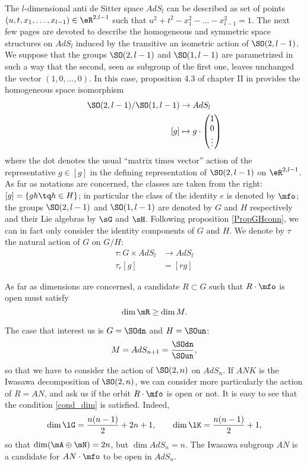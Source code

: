 The $l$-dimensional anti de Sitter space $AdS_l$ can be described as set of points $(u,t,x_1,\ldots,x_{l-1})\in \eR^{2,l-1}$  such that $u^2+t^2-x_1^2-\ldots-x_{l-1}^2=1$. The next few pages are devoted to describe the homogeneous and symmetric space structures on $AdS_l$ induced by the transitive an isometric action of $\SO(2,l-1)$. We suppose that the groups $\SO(2,l-1)$ and $\SO(1,l-1)$ are parametrized in such a way that the second, seen as subgroup of the first one, leaves unchanged the vector $(1,0,\ldots,0)$. In this case, proposition 4.3 of chapter II in \cite{Helgason} provides the homogeneous space isomorphism
\begin{equation}
\begin{aligned}
  \SO(2,l-1)/\SO(1,l-1)&\to AdS_l \\ 
[g]&\mapsto  
 g\cdot
\begin{pmatrix}
1\\0\\\vdots
\end{pmatrix}
\end{aligned}
\end{equation}
where the dot denotes the usual ``matrix times vector'' action of the representative $g\in [g]$ in the defining representation of $\SO(2,l-1)$ on $\eR^{2,l-1}$. As far as notations are concerned, the classes are taken from the right:  $[g]=\{gh\tq h\in H\}$; in particular the class of the identity $e$ is denoted by $\mfo$; the groups $\SO(2,l-1)$ and $\SO(1,l-1)$ are denoted by $G$ and $H$ respectively and their Lie algebras by $\sG$ and $\sH$. Following proposition \ref{PropGHconn}, we can in fact only consider the identity components of $G$ and $H$. We denote by $\tau$ the natural action of $G$ on $G/H$:
\begin{equation}
\begin{aligned}
 \tau\colon G\times AdS_l&\to AdS_l \\ 
   \tau_r[g]&= [rg] 
\end{aligned}
\end{equation}

As far as dimensions are concerned, a candidate $R\subset G$ such that $R\cdot\mfo$ is open must satisfy
\begin{equation}\label{cond_dim}
                  \dim\mR\geq\dim M.
\end{equation}

The case that interest us is $G=\SOdn$ and $H=\SOun$:
\[
M=AdS_{n+1}=\dfrac{\SOdn}{\SOun},
\]
 so that we have to consider the action of $\SO(2,n)$ on $AdS_n$.  If $ANK$ is the Iwasawa decomposition of $\SO(2,n)$, we can consider more particularly the action of $R=AN$, and ask us if the orbit $R\cdot\mfo$ is open or not. It is easy to see that the condition \eqref{cond_dim} is satisfied. Indeed,
\[
 \dim\lG=\frac{n(n-1)}{2}+2n+1,\qquad\dim\lK=\frac{n(n-1)}{2}+1,
\]
so that $\dim(\mA\oplus\mN)=2n$, but $\dim AdS_n=n$. The Iwasawa subgroup $AN$ is a candidate for $AN\cdot\mfo$ to be open in $AdS_n$.

